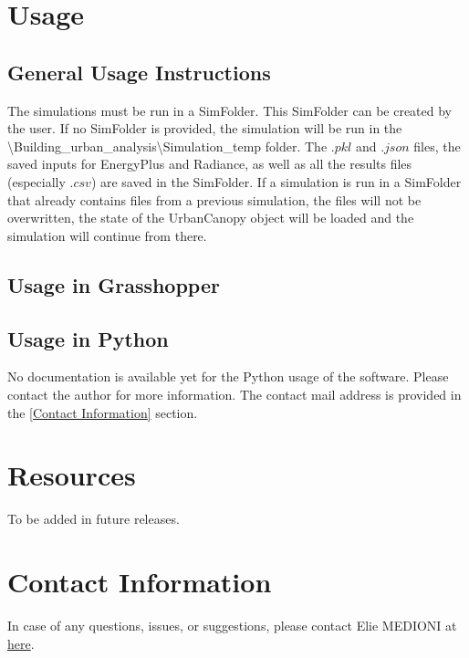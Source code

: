 \documentclass[a4paper,12pt]{article} %
\begin{document}
\section{Usage}
\label{sec:usage}

    \subsection{General Usage Instructions}
    \label{subsec:general-usage-instructions}
    The simulations must be run in a \gls{SimFolder}.
    This \gls{SimFolder} can be created by the user.
    If no \gls{SimFolder} is provided, the simulation will be run in the \textbackslash Building\_urban\_analysis\textbackslash Simulation\_temp folder.
    The $.pkl$ and $.json$ files, the saved inputs for EnergyPlus and Radiance, as well as all the results files (especially $.csv$) are saved in the \gls{SimFolder}.
    If a simulation is run in a \gls{SimFolder} that already contains files from a previous simulation, the files will not be overwritten, the state of the \gls{UrbanCanopy} object will be loaded and the simulation will continue from there.


    \subsection{Usage in Grasshopper}
    \label{subsec:usage-in-grasshopper}






    \subsection{Usage in Python}
    No documentation is available yet for the Python usage of the software.
    Please contact the author for more information.
    The contact mail address is provided in the \ref{Contact Information} section.




\section{Resources}
\label{sec:resources}
To be added in future releases.

\section{Contact Information}
\label{sec:Contact Information}
In case of any questions, issues, or suggestions, please contact Elie MEDIONI at \href{mailto:elie-medioni@campus.technion.ac.il}{here}.
\end{document}
